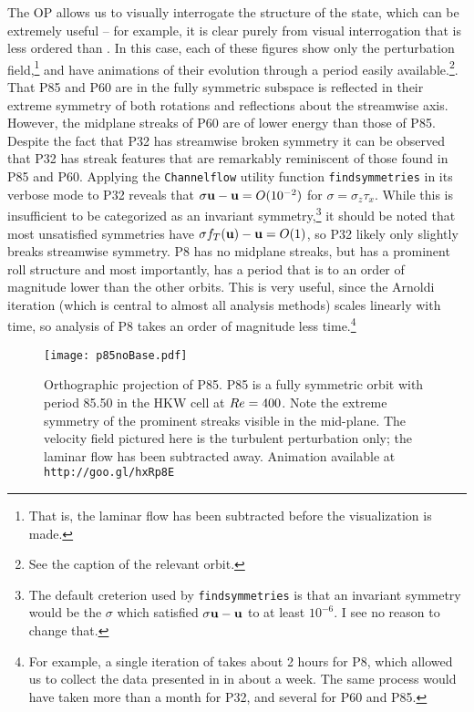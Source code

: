 The OP allows us to visually interrogate the structure of the state, which can be extremely useful -- for example, it is clear purely from visual interrogation that  is less ordered than . In this case, each of these figures show only the perturbation field,\footnote{That is, the laminar flow has been subtracted before the visualization is made.} and have animations of their evolution through a period easily available.\footnote{See the caption of the relevant orbit.}. That P85 and P60 are in the fully symmetric subspace is reflected in their extreme symmetry of both rotations and reflections about the streamwise axis. However, the midplane streaks of P60 are of lower energy than those of P85. Despite the fact that P32 has streamwise broken symmetry it can be observed that P32 has streak features that are remarkably reminiscent of those found in P85 and P60. Applying the {\tt Channelflow} utility function {\tt findsymmetries} in its verbose mode to P32 reveals that $\sigma \mathbf{u} - \mathbf{u} = O(10^{-2})$ for $\sigma = \sigma_z \tau_x$. While this is insufficient to be categorized as an invariant symmetry,\footnote{The default creterion used by {\tt findsymmetries} is that an invariant symmetry would be the $\sigma$ which satisfied $\sigma\mathbf{u} - \mathbf{u}$ to at least $10^{-6}$. I see no reason to change that.} it should be noted that most unsatisfied symmetries have  $\sigma f_T(\mathbf{u}) - \mathbf{u} = O(1)$, so P32 likely only slightly breaks streamwise symmetry.   P8 has no midplane streaks, but has a prominent roll structure and most importantly, has a period that is to an order of magnitude lower than the other orbits. This is very useful, since the Arnoldi iteration (which is central to almost all analysis methods) scales linearly with time, so analysis of P8 takes an order of magnitude less time.\footnote{For example, a single iteration of  takes about 2 hours for P8, which allowed us to collect the data presented in  in about a week. The same process would have taken more than a month for P32, and several for P60 and P85.}

\begin{figure}
\centerline{\texttt{[image: p85noBase.pdf]}}
\caption{Orthographic projection of P85. P85 is a fully symmetric orbit with period 85.50 in the HKW cell at $Re=400$. Note the extreme symmetry of the prominent streaks visible in the mid-plane. The velocity field pictured here is the turbulent perturbation only; the laminar flow has been subtracted away.{ Animation available at {\tt http://goo.gl/hxRp8E}}}\label{fig:p85}
\end{figure}

